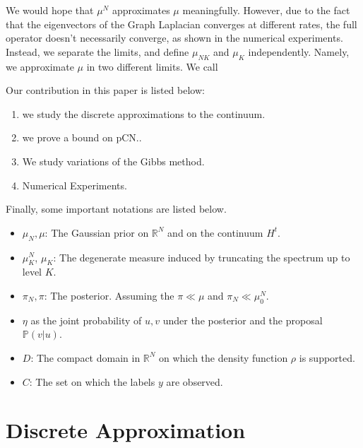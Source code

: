 \documentclass[final]{siamart0516}
\newcommand{\bbP}{\mathbb{P}}
\begin{document}
We would hope that  $\mu^N$ approximates $\mu$ meaningfully. However, due to the fact that the eigenvectors of the Graph Laplacian converges at different rates, the full operator doesn't necessarily converge, as shown in the numerical experiments. 
Instead, we separate the limits, and define $\mu_{NK}$ and $\mu_K$ independently.  Namely, we approximate $\mu$ in two different limits. We call 

Our contribution in this paper is listed below:
\begin{enumerate}
\item we study the discrete approximations to the continuum. 
\item we prove a bound on pCN..
\item We study variations of the Gibbs method. 
\item Numerical Experiments. 
\end{enumerate}

Finally, some important notations are listed below. 
\begin{itemize}
\item $\mu_N, \mu$: The Gaussian prior on $\mathbb{R}^N$ and on the continuum $H^t$.
\item $\mu^N_K$, $\mu_K$: The degenerate measure induced by truncating the spectrum up to level $K$. 
\item $\pi_N, \pi$: The posterior. Assuming the $\pi \ll \mu$ and  $\pi_N  \ll \mu^N_0$. 
\item $\eta$ as the joint probability of $u, v$ under the posterior and the proposal $\bbP(v|u)$. 
\item $D$: The compact domain in $\mathbb{R}^N$ on which the density function $\rho$ is supported. 
\item $C$: The set on which the labels $y$ are observed. 
\end{itemize}


\section{Discrete Approximation}
\end{document}
